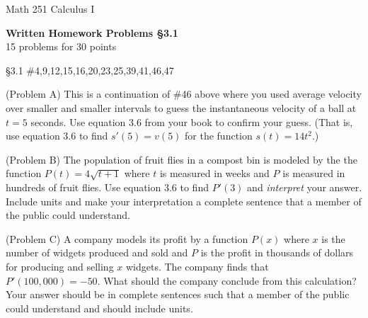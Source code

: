 \documentclass[11pt]{report}
\theoremstyle{plain}
\begin{document}
\hfill Math 251 Calculus I
\begin{center}
\Large{\textbf{Written Homework Problems \S 3.1}} \\
15 problems for 30 points\\
\end{center}

\begin{description}
\item{\S 3.1} \#4,9,12,15,16,20,23,25,39,41,46,47

\item{(Problem A)} This is a continuation of \#46 above where you used average velocity over smaller and smaller intervals to guess the instantaneous velocity of a ball at $t=5$ seconds. Use equation 3.6 from your book to confirm your guess. (That is, use equation 3.6 to find $s'(5)=v(5)$ for the function $s(t)=14t^2.$)

\item{(Problem B)} The population of fruit flies in a compost bin is modeled by the the function $P(t)=4\sqrt{t+1}$ where $t$ is measured in weeks and $P$ is measured in hundreds of fruit flies. Use equation 3.6 to find $P'(3)$ and \emph{interpret} your answer. Include units and make your interpretation a complete sentence that a member of the public could understand.

\item{(Problem C)} A company models its profit by a function $P(x)$ where $x$ is the number of widgets produced and sold and $P$ is the profit in thousands of dollars for producing and selling $x$ widgets. The company finds that $P'(100,000)=-50.$ What should the company conclude from this calculation? Your answer should be in complete sentences such that a member of the public could understand and should include units.


\end{description}
\end{document}
